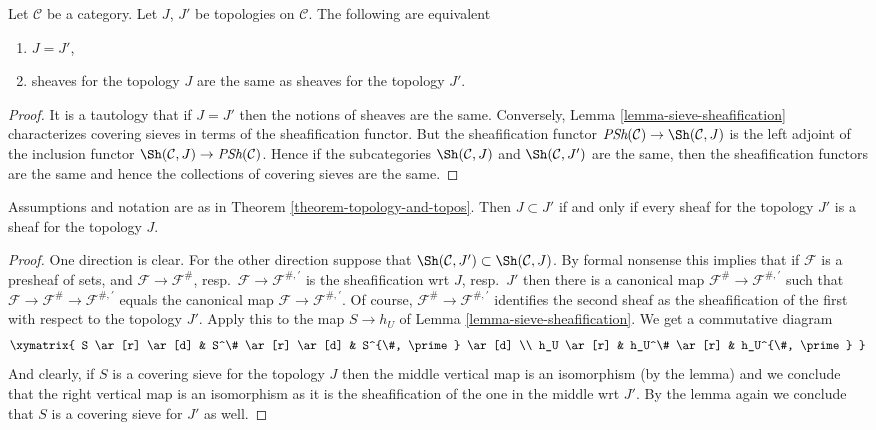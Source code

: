 \begin{theorem}
\label{theorem-topology-and-topos}
Let $\mathcal{C}$ be a category.
Let $J$, $J'$ be topologies on $\mathcal{C}$.
The following are equivalent
\begin{enumerate}
\item $J = J'$,
\item sheaves for the topology $J$ are the same as
sheaves for the topology $J'$.
\end{enumerate}
\end{theorem}

\begin{proof}
It is a tautology that if $J = J'$ then the notions of sheaves
are the same. Conversely, Lemma \ref{lemma-sieve-sheafification}
characterizes covering sieves in terms of the sheafification
functor. But the sheafification functor
$\textit{PSh}(\mathcal{C}) \to \Sh(\mathcal{C}, J)$
is the left adjoint of the inclusion functor
$\Sh(\mathcal{C}, J) \to \textit{PSh}(\mathcal{C})$.
Hence if the subcategories
$\Sh(\mathcal{C}, J)$ and
$\Sh(\mathcal{C}, J')$ are the same, then the sheafification
functors are the same and hence the collections of covering
sieves are the same.
\end{proof}

\begin{lemma}
\label{lemma-finer-topology}
Assumptions and notation are as in Theorem \ref{theorem-topology-and-topos}.
Then $J \subset J'$ if and only if every sheaf for the
topology $J'$ is a sheaf for the topology $J$.
\end{lemma}

\begin{proof}
One direction is clear. For the other direction suppose that
$\Sh(\mathcal{C}, J') \subset \Sh(\mathcal{C}, J)$.
By formal nonsense this implies
that if $\mathcal{F}$ is a presheaf of sets,
and $\mathcal{F} \to \mathcal{F}^\#$,
resp.\ $\mathcal{F} \to \mathcal{F}^{\#, \prime}$
is the sheafification wrt $J$, resp.\ $J'$ then there
is a canonical map $\mathcal{F}^\# \to \mathcal{F}^{\#, \prime}$
such that
$\mathcal{F} \to \mathcal{F}^\# \to \mathcal{F}^{\#, \prime}$
equals the canonical map $\mathcal{F} \to \mathcal{F}^{\#, \prime}$.
Of course, $\mathcal{F}^\# \to \mathcal{F}^{\#, \prime}$
identifies the second sheaf as the sheafification of the first
with respect to the topology $J'$.
Apply this to the map $S \to h_U$ of
Lemma \ref{lemma-sieve-sheafification}. We get a commutative
diagram
$$
\xymatrix{
S \ar[r] \ar[d] &
S^\# \ar[r] \ar[d] &
S^{\#, \prime} \ar[d] \\
h_U \ar[r] &
h_U^\# \ar[r] &
h_U^{\#, \prime}
}
$$
And clearly, if $S$ is a covering sieve for the topology $J$
then the middle vertical map is an isomorphism (by the lemma)
and we conclude that the right vertical map is an isomorphism as
it is the sheafification of the one in the middle wrt $J'$.
By the lemma again we conclude that $S$ is a covering sieve
for $J'$ as well.
\end{proof}




